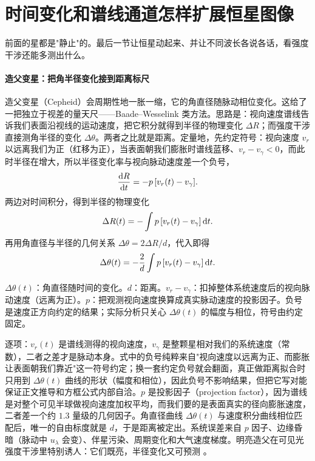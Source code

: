 \section{时间变化和谱线通道怎样扩展恒星图像}
\label{sec:e17-time-line}

前面的星都是"静止"的。最后一节让恒星动起来、并让不同波长各说各话，看强度干涉还能多测出什么。

\paragraph{造父变星：把角半径变化接到距离标尺}
\label{sec:e17-cepheid}

造父变星（Cepheid）会周期性地一胀一缩，它的角直径随脉动相位变化。这给了一把独立于视差的量天尺——Baade--Wesselink 类方法。思路是：视向速度谱线告诉我们表面沿视线的运动速度，把它积分就得到半径的物理变化 \(\Delta R\)；而强度干涉直接测角半径的变化 \(\Delta\theta\)。两者之比就是距离。定量地，先约定符号：视向速度 \(v_r\) 以远离我们为正（红移为正），当表面朝我们膨胀时谱线蓝移、\(v_r-v_\gamma<0\)，而此时半径在增大，所以半径变化率与视向脉动速度差一个负号，
\[
  \frac{{\rm d}R}{{\rm d}t}=-p\,[v_r(t)-v_\gamma].
\]
两边对时间积分，得到半径的物理变化
\[
  \Delta R(t)=-\int p\,[v_r(t)-v_\gamma]\,{\rm d}t.
\]
再用角直径与半径的几何关系 \(\Delta\theta=2\Delta R/d\)，代入即得
\begin{equation}
  \Delta\theta(t)=-\frac{2}{d}
  \int p\,[v_r(t)-v_\gamma]\,{\rm d}t .
  \label{eq:e17-baade-wesselink}
\end{equation}
\begin{formulaexplain}
\(\Delta\theta(t)\)：角直径随时间的变化。\(d\)：距离。\(v_r-v_\gamma\)：扣掉整体系统速度后的视向脉动速度（远离为正）。\(p\)：把观测视向速度换算成真实脉动速度的投影因子。负号是速度正方向约定的结果；实际分析只关心 \(\Delta\theta(t)\) 的幅度与相位，符号由约定固定。
\end{formulaexplain}
逐项：\(v_r(t)\) 是谱线测得的视向速度，\(v_\gamma\) 是整颗星相对我们的系统速度（常数），二者之差才是脉动本身。式中的负号纯粹来自"视向速度以远离为正、而膨胀让表面朝我们靠近"这一符号约定；换一套约定负号就会翻面，真正做距离拟合时只用到 \(\Delta\theta(t)\) 曲线的形状（幅度和相位），因此负号不影响结果，但把它写对能保证正文推导和方框公式内部自洽。\(p\) 是投影因子（projection factor），因为谱线是对整个可见半球做视向速度加权平均，而我们要的是表面真实的径向膨胀速度，二者差一个约 \(1.3\) 量级的几何因子。角直径曲线 \(\Delta\theta(t)\) 与速度积分曲线相位匹配后，唯一的自由标度就是 \(d\)，于是距离被定出。系统误差来自 \(p\) 因子、边缘昏暗（脉动中 \(u_\lambda\) 会变）、伴星污染、周期变化和大气速度梯度。明亮造父在可见光强度干涉里特别诱人：它们既亮，半径变化又可预测 \citep{1997A&A...320..799F,2007A&A...476...73F}。

